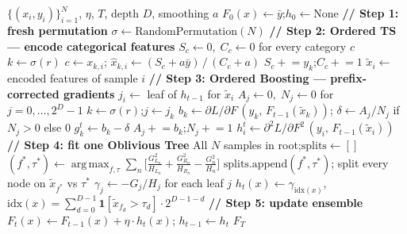 \documentclass[11pt, a4paper]{article}
\begin{document}
\begin{algorithm}[t]
\caption{CatBoost-style ordered boosting with Oblivious Trees (educational approximation)}
{\small
\begin{algorithmic}[1]
\Require $\{(x_i, y_i)\}_{i=1}^N$,\; $\eta$,\; $T$,\; depth $D$,\; smoothing $a$
\State $F_0(x) \leftarrow \bar{y}$;\enspace $h_0 \leftarrow \mathrm{None}$
  \State \textbf{// Step 1: fresh permutation}
  \State $\sigma \leftarrow \mathrm{RandomPermutation}(N)$
  \State \textbf{// Step 2: Ordered TS --- encode categorical features}
  \State $S_c \leftarrow 0,\; C_c \leftarrow 0$ for every category $c$
    \State $k \leftarrow \sigma(r)$
      \State $c \leftarrow x_{k,i}$;\enspace
        $\hat{x}_{k,i} \leftarrow (S_c + a\bar{y})\,/\,(C_c + a)$
        \hfill{}
      \State $S_c \mathrel{+}= y_k$;\enspace $C_c \mathrel{+}= 1$
        \hfill{}
    \EndFor
  \EndFor
  \State $\tilde{x}_i \leftarrow$ encoded features of sample $i$
  \State \textbf{// Step 3: Ordered Boosting --- prefix-corrected gradients}
  \State $j_i \leftarrow$ leaf of $h_{t-1}$ for $\tilde{x}_i$
    \hfill{}
  \State $A_j \leftarrow 0,\; N_j \leftarrow 0$ for $j = 0,\ldots,2^D-1$
    \State $k \leftarrow \sigma(r)$;\enspace $j \leftarrow j_k$
    \State $b_k \leftarrow \partial L/\partial F\,(y_k,\,F_{t-1}(\tilde{x}_k))$;\enspace
      $\delta \leftarrow A_j/N_j$ if $N_j{>}0$ else $0$
    \State $g_k^t \leftarrow b_k - \delta$
      \hfill{}
    \State $A_j \mathrel{+}= b_k$;\enspace $N_j \mathrel{+}= 1$
      \hfill{}
  \EndFor
  \State $h_i^t \leftarrow \partial^2 L/\partial F^2\,(y_i,\,F_{t-1}(\tilde{x}_i))$
    \hfill{}
  \State \textbf{// Step 4: fit one Oblivious Tree}
  \State All $N$ samples in root;\enspace $\mathrm{splits} \leftarrow []$
    \State $(f^*, \tau^*) \leftarrow \operatorname{arg\,max}_{f,\tau}
      \sum_{n}\!
      \bigl[\tfrac{G_{L_n}^2}{H_{L_n}}+\tfrac{G_{R_n}^2}{H_{R_n}}-\tfrac{G_n^2}{H_n}\bigr]$
      \hfill{}
    \State $\mathrm{splits}.\mathrm{append}(f^*,\tau^*)$;\enspace
      split every node on $\tilde{x}_{f^*}$ vs $\tau^*$
  \EndFor
  \State $\gamma_j \leftarrow -G_j/H_j$ for each leaf $j$
    \hfill{}
  \State $h_t(x) \leftarrow \gamma_{\mathrm{idx}(x)}$,\quad
    $\mathrm{idx}(x)=\sum_{d=0}^{D-1}\mathbf{1}[\tilde{x}_{f_d}{>}\tau_d]\cdot 2^{D-1-d}$
    \hfill{}
  \State \textbf{// Step 5: update ensemble}
  \State $F_t(x) \leftarrow F_{t-1}(x)+\eta\cdot h_t(x)$;\enspace
    $h_{t-1} \leftarrow h_t$
\EndFor
\State \Return $F_T$
\end{algorithmic}
}
\end{algorithm}
\end{document}
